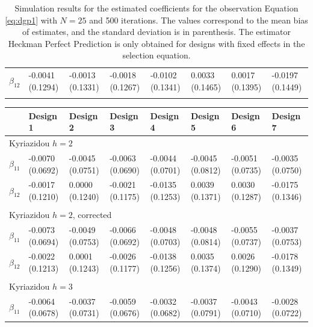 \begin{table}
\begin{adjustwidth}{-.5in}{-.5in}
\begin{tabular}{p{3cm}p{1.3cm}p{1.3cm}p{1.3cm}p{1.3cm}p{1.3cm}p{1.3cm}p{1.3cm}}
    $\beta_{12}$  & -0.0041 (0.1294) & -0.0013 (0.1331) & -0.0018 (0.1267) &  -0.0102 (0.1341) & 0.0033 (0.1465) &  0.0017 (0.1395) & -0.0197 (0.1449)\\
     & & & & & & & \\
    \hline
\end{tabular}
\caption{\footnotesize{Simulation results for the estimated coefficients for the observation Equation \ref{eq:dgp1} with $N=25$ and 500 iterations. The values correspond to the mean bias of estimates, and the standard deviation is in parenthesis. The estimator Heckman Perfect Prediction is only obtained for designs with fixed effects in the selection equation.}}
\label{tab:6}
\end{adjustwidth}
\end{table}
\begin{table}
\begin{adjustwidth}{-.5in}{-.5in}
\small
\centering
\begin{tabular}{p{3cm}p{1.3cm}p{1.3cm}p{1.3cm}p{1.3cm}p{1.3cm}p{1.3cm}p{1.3cm}}
  \hline
   \quad & Design 1 & Design 2 & Design 3 & Design 4 & Design 5 & Design 6 & Design 7  \\
   \hline
    \multicolumn{8}{l}{Kyriazidou $h=2$} \\
   \hline
    $\beta_{11}$  & -0.0070 (0.0692) & -0.0045 (0.0751) & -0.0063 (0.0690) &  -0.0044 (0.0701) & -0.0045 (0.0812) & -0.0051 (0.0735) & -0.0035 (0.0750)\\
    $\beta_{12}$  & -0.0017 (0.1210) & 0.0000 (0.1240) & -0.0021 (0.1175) & -0.0135 (0.1253) & 0.0039 (0.1371) &  0.0030 (0.1287) & -0.0175 (0.1346)\\
    & & & & & & & \\
    \hline
    \multicolumn{8}{l}{Kyriazidou $h=2$, corrected} \\
   \hline
    $\beta_{11}$  & -0.0073 (0.0694) & -0.0049 (0.0753) & -0.0066 (0.0692) &  -0.0048 (0.0703) & -0.0048 (0.0814) & -0.0055 (0.0737) & -0.0037 (0.0753) \\
    $\beta_{12}$  & -0.0022 (0.1213) & 0.0001 (0.1243) & -0.0026 (0.1177) &  -0.0138 (0.1256) & 0.0035 (0.1374) &  0.0026 (0.1290) & -0.0178 (0.1349) \\
         & & & & & & & \\
    \hline
    \multicolumn{8}{l}{Kyriazidou $h=3$} \\
   \hline
    $\beta_{11}$  & -0.0064 (0.0678) & -0.0037 (0.0731) & -0.0059 (0.0676) & -0.0032 (0.0682) & -0.0037 (0.0791) &  -0.0043 (0.0710) & -0.0028 (0.0722) \\

\end{tabular}
\end{adjustwidth}
\end{table}
